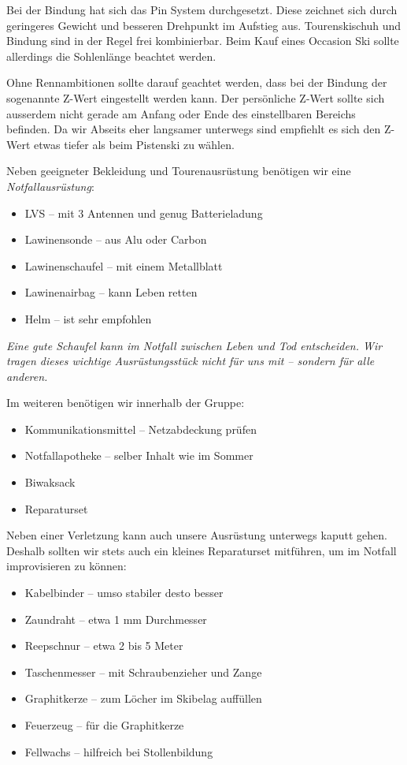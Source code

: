 Bei der Bindung hat sich das Pin System durchgesetzt.
Diese zeichnet sich durch geringeres Gewicht und besseren Drehpunkt im Aufstieg aus.
Tourenskischuh und Bindung sind in der Regel frei kombinierbar.
Beim Kauf eines Occasion Ski sollte allerdings die Sohlenlänge beachtet werden.

Ohne Rennambitionen sollte darauf geachtet werden, dass bei der Bindung der sogenannte Z-Wert eingestellt werden kann.
Der persönliche Z-Wert sollte sich ausserdem nicht gerade am Anfang oder Ende des einstellbaren Bereichs befinden.
Da wir Abseits eher langsamer unterwegs sind empfiehlt es sich den Z-Wert etwas tiefer als beim Pistenski zu wählen.

Neben geeigneter Bekleidung und Tourenausrüstung benötigen wir eine \textit{Notfallausrüstung}:

\begin{itemize}
  \item{LVS -- mit 3 Antennen und genug Batterieladung}
  \item{Lawinensonde -- aus Alu oder Carbon}
  \item{Lawinenschaufel -- mit einem Metallblatt}
  \item{Lawinenairbag -- kann Leben retten}
  \item{Helm -- ist sehr empfohlen}
\end{itemize}

\textit{Eine gute Schaufel kann im Notfall zwischen Leben und Tod entscheiden. Wir tragen dieses wichtige Ausrüstungsstück nicht für uns mit -- sondern für alle anderen.}

Im weiteren benötigen wir innerhalb der Gruppe:

\begin{itemize}
  \item{Kommunikationsmittel -- Netzabdeckung prüfen}
  \item{Notfallapotheke -- selber Inhalt wie im Sommer}
  \item{Biwaksack}
  \item{Reparaturset}
\end{itemize}

Neben einer Verletzung kann auch unsere Ausrüstung unterwegs kaputt gehen.
Deshalb sollten wir stets auch ein kleines Reparaturset mitführen, um im Notfall improvisieren zu können:

\begin{itemize}
  \item{Kabelbinder -- umso stabiler desto besser}
  \item{Zaundraht -- etwa 1 mm Durchmesser}
  \item{Reepschnur -- etwa 2 bis 5 Meter}
  \item{Taschenmesser -- mit Schraubenzieher und Zange}
  \item{Graphitkerze -- zum Löcher im Skibelag auffüllen}
  \item{Feuerzeug -- für die Graphitkerze}
  \item{Fellwachs -- hilfreich bei Stollenbildung}
\end{itemize}

